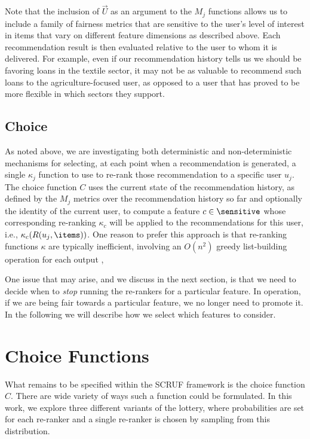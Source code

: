 Note that the inclusion of $\vec{U}$ as an argument to the $M_j$ functions allows us to include a family of fairness metrics that are sensitive to the user's level of interest in items that vary on different feature dimensions as described above. Each recommendation result is then evaluated relative to the user to whom it is delivered. For example, even if our recommendation history tells us we should be favoring loans in the textile sector, it may not be as valuable to recommend such loans to the agriculture-focused user, as opposed to a user that has proved to be more flexible in which sectors they support. 

\subsection{Choice}
As noted above, we are investigating both deterministic and non-deterministic mechanisms for selecting, at each point when a recommendation is generated, a single $\kappa_j$ function to use to re-rank those recommendation to a specific user $u_j$. The choice function $C$ uses the current state of the recommendation history, as defined by the $M_j$ metrics over the recommendation history so far and optionally the identity of the current user, to compute a feature $c \in \sensitive$  whose corresponding re-ranking $\kappa_c$ will be applied to the recommendations for this user, i.e., $\kappa_c(R(u_j, \items))$. One reason to prefer this approach is that re-ranking functions $\kappa$ are typically inefficient, involving an $O(n^2)$ greedy list-building operation for each output \cite{liu2018personalizing,liu2019personalized,santos2015search, carbonell1998use,sonboli-umap-2020}, 

One issue that may arise, and we discuss in the next section, is that we need to decide when to \emph{stop} running the re-rankers for a particular feature.  In operation, if we are being fair towards a particular feature, we no longer need to promote it.  In the following we will describe how we select which features to consider.

\section{Choice Functions}

What remains to be specified within the SCRUF framework is the choice function $C$. There are wide variety of ways such a function could be formulated. In this work, we explore three different variants of the lottery, where probabilities are set for each re-ranker and a single re-ranker is chosen by sampling from this distribution.


